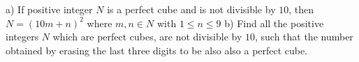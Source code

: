 a) If positive integer $N$ is a perfect cube and is not divisible by $10$, then $N=(10m+n)^2$ where $m,n \in N$ with $1\le n\le 9$
b) Find all the positive integers $N$ which are perfect cubes, are not divisible by $10$, such that the number obtained by erasing the last three digits to be also also a perfect cube.